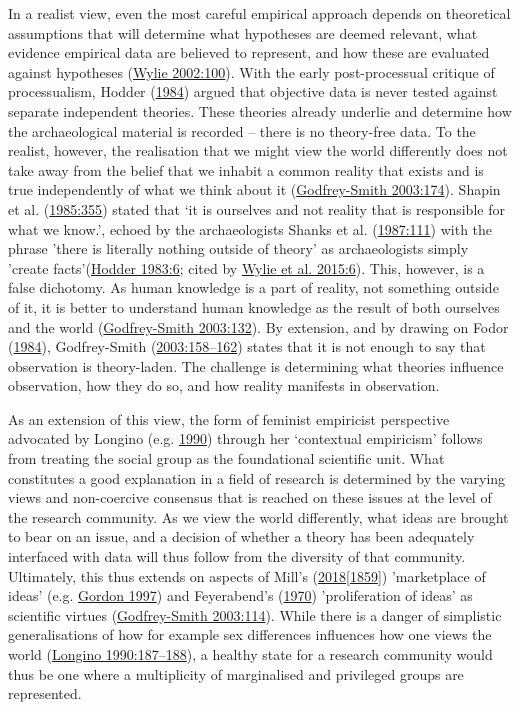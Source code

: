\documentclass[
  a4paper,
  oneside]{uiophdthesis}
\begin{document}
In a realist view, even the most careful empirical approach depends on theoretical assumptions that will determine what hypotheses are deemed relevant, what evidence empirical data are believed to represent, and how these are evaluated against hypotheses (\protect\hyperlink{ref-wylie2002}{Wylie 2002:100}). With the early post-processual critique of processualism, Hodder (\protect\hyperlink{ref-hodder1984}{1984}) argued that objective data is never tested against separate independent theories. These theories already underlie and determine how the archaeological material is recorded -- there is no theory-free data. To the realist, however, the realisation that we might view the world differently does not take away from the belief that we inhabit a common reality that exists and is true independently of what we think about it (\protect\hyperlink{ref-godfrey-smith2003}{Godfrey-Smith 2003:174}). Shapin et al. (\protect\hyperlink{ref-shapin1985}{1985:355}) stated that `it is ourselves and not reality that is responsible for what we know.', echoed by the archaeologists Shanks et al. (\protect\hyperlink{ref-shanks1987}{1987:111}) with the phrase 'there is literally nothing outside of theory' as archaeologists simply 'create facts'(\protect\hyperlink{ref-hodder1983}{Hodder 1983:6}; cited by \protect\hyperlink{ref-wylie2015}{Wylie et al. 2015:6}). This, however, is a false dichotomy. As human knowledge is a part of reality, not something outside of it, it is better to understand human knowledge as the result of both ourselves and the world (\protect\hyperlink{ref-godfrey-smith2003}{Godfrey-Smith 2003:132}). By extension, and by drawing on Fodor (\protect\hyperlink{ref-fodor1984}{1984}), Godfrey-Smith (\protect\hyperlink{ref-godfrey-smith2003}{2003:158--162}) states that it is not enough to say that observation is theory-laden. The challenge is determining what theories influence observation, how they do so, and how reality manifests in observation.

As an extension of this view, the form of feminist empiricist perspective advocated by Longino (e.g. \protect\hyperlink{ref-longino1990}{1990}) through her `contextual empiricism' follows from treating the social group as the foundational scientific unit. What constitutes a good explanation in a field of research is determined by the varying views and non-coercive consensus that is reached on these issues at the level of the research community. As we view the world differently, what ideas are brought to bear on an issue, and a decision of whether a theory has been adequately interfaced with data will thus follow from the diversity of that community. Ultimately, this thus extends on aspects of Mill's (\protect\hyperlink{ref-mill1859}{2018{[}1859{]}}) 'marketplace of ideas' (e.g. \protect\hyperlink{ref-gordon1997}{Gordon 1997}) and Feyerabend's (\protect\hyperlink{ref-feyerabend1970}{1970}) 'proliferation of ideas' as scientific virtues (\protect\hyperlink{ref-godfrey-smith2003}{Godfrey-Smith 2003:114}). While there is a danger of simplistic generalisations of how for example sex differences influences how one views the world (\protect\hyperlink{ref-longino1990}{Longino 1990:187--188}), a healthy state for a research community would thus be one where a multiplicity of marginalised and privileged groups are represented.
\end{document}

